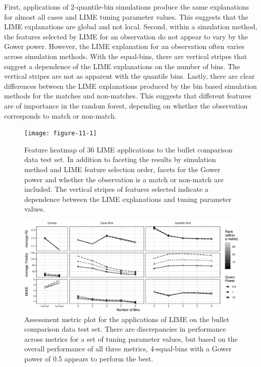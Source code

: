 \documentclass[AMS,STIX2COL]{WileyNJD-v2}\usepackage[]{graphicx}\usepackage[]{color}
\newenvironment{knitrout}{}{} %
\begin{document}
First, applications of 2-quantile-bin simulations produce the same explanations for almost all cases and LIME tuning parameter values. This suggests that the LIME explanations are global and not local. Second, within a simulation method, the features selected by LIME for an observation do not appear to vary by the Gower power. However, the LIME explanation for an observation often varies across simulation methods. With the equal-bins, there are vertical stripes that suggest a dependence of the LIME explanations on the number of bins. The vertical stripes are not as apparent with the quantile bins. Lastly, there are clear differences between the LIME explanations produced by the bin based simulation methods for the matches and non-matches. This suggests that different features are of importance in the random forest, depending on whether the observation corresponds to match or non-match.

\begin{figure}[!thp]
\begin{knitrout}
\color{fgcolor}

{\centering \texttt{[image: figure-11-1]} 

}



\end{knitrout}
\caption{Feature heatmap of 36 LIME applications to the bullet comparison data test set. In addition to faceting the results by simulation method and LIME feature selection order, facets for the Gower power and whether the observation is a match or non-match are included. The vertical stripes of features selected indicate a dependence between the LIME explanations and tuning parameter values.}
\label{fig:figure-11}

\vspace*{\floatsep}

\begin{knitrout}
\color{fgcolor}

{\centering \includegraphics[width=6.5in]{figure-12-1} 

}



\end{knitrout}
\caption{Assessment metric plot for the applications of LIME on the bullet comparison data test set. There are discrepancies in performance across metrics for a set of tuning parameter values, but based on the overall performance of all three metrics, 4-equal-bins with a Gower power of 0.5 appears to perform the best.}
\label{fig:figure-12}
\end{figure}
\end{document}
